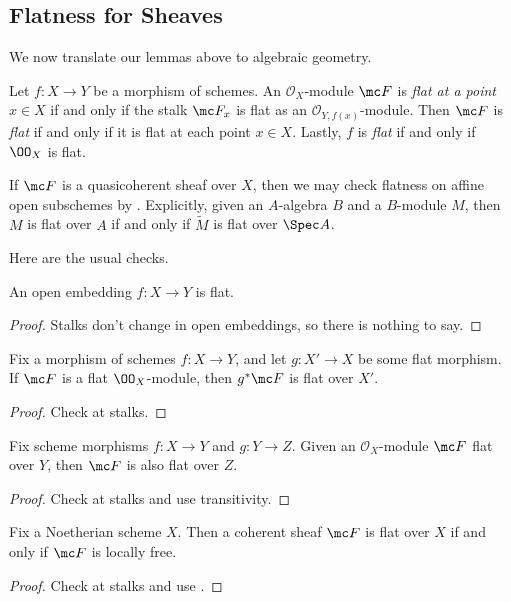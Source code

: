 \documentclass[../notes.tex]{subfiles}
\begin{document}
\subsection{Flatness for Sheaves}
We now translate our lemmas above to algebraic geometry.
\begin{definition}[flat]
	Let $f\colon X\to Y$ be a morphism of schemes. An $\mathcal O_X$-module $\mc F$ is \textit{flat at a point $x\in X$} if and only if the stalk $\mc F_x$ is flat as an $\mathcal O_{Y,f(x)}$-module. Then $\mc F$ is \textit{flat} if and only if it is flat at each point $x\in X$. Lastly, $f$ is \textit{flat} if and only if $\OO_X$ is flat.
\end{definition}
\begin{remark}
	If $\mc F$ is a quasicoherent sheaf over $X$, then we may check flatness on affine open subschemes by . Explicitly, given an $A$-algebra $B$ and a $B$-module $M$, then $M$ is flat over $A$ if and only if $\widetilde M$ is flat over $\Spec A$.
\end{remark}
Here are the usual checks.
\begin{lemma}
	An open embedding $f\colon X\to Y$ is flat.
\end{lemma}
\begin{proof}
	Stalks don't change in open embeddings, so there is nothing to say.
\end{proof}
\begin{lemma}
	Fix a morphism of schemes $f\colon X\to Y$, and let $g\colon X'\to X$ be some flat morphism. If $\mc F$ is a flat $\OO_X$-module, then $g^*\mc F$ is flat over $X'$.
\end{lemma}
\begin{proof}
	Check at stalks.
\end{proof}
\begin{lemma}[Transitivity]
	Fix scheme morphisms $f\colon X\to Y$ and $g\colon Y\to Z$. Given an $\mathcal O_X$-module $\mc F$ flat over $Y$, then $\mc F$ is also flat over $Z$.
\end{lemma}
\begin{proof}
	Check at stalks and use transitivity.
\end{proof}
\begin{lemma}
	Fix a Noetherian scheme $X$. Then a coherent sheaf $\mc F$ is flat over $X$ if and only if $\mc F$ is locally free.
\end{lemma}
\begin{proof}
	Check at stalks and use .
\end{proof}
\end{document}
